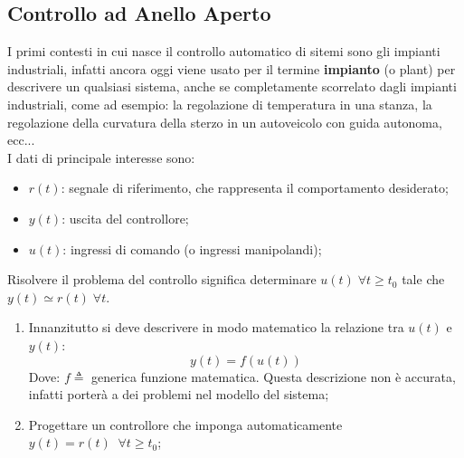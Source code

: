 \documentclass[12pt]{article}
\begin{document}
\subsection{Controllo ad Anello Aperto}\label{sec:controllo-ad-anello-aperto}
I primi contesti in cui nasce il controllo automatico di sitemi sono gli impianti industriali, infatti ancora oggi viene usato per il termine \textbf{impianto} (o plant) per descrivere un qualsiasi sistema, anche se completamente scorrelato dagli impianti industriali, come ad esempio: la regolazione di temperatura in una stanza, la regolazione della curvatura della sterzo in un autoveicolo con guida autonoma, ecc... \\
I dati di principale interesse sono:
\begin{itemize}
    \item $r(t)$: segnale di riferimento, che rappresenta il comportamento desiderato;
    \item $y(t)$: uscita del controllore;
    \item $u(t)$: ingressi di comando (o ingressi manipolandi);
\end{itemize}
Risolvere il problema del controllo significa determinare $u(t) \;\forall t \geqslant t_0$ tale che $y(t) \simeq r(t) \;\forall t$.

\begin{enumerate}
    \item Innanzitutto si deve descrivere in modo matematico la relazione tra $u(t)$ e $y(t)$:
        \[ y(t) = f(u(t)) \]
        Dove: $f \triangleq$ generica funzione matematica. Questa descrizione non \`e accurata, infatti porter\`a a dei problemi nel modello del sistema;
    \item Progettare un controllore che imponga automaticamente $y(t) = r(t) \;\; \forall t \geqslant t_0$;
\end{enumerate}
\end{document}
